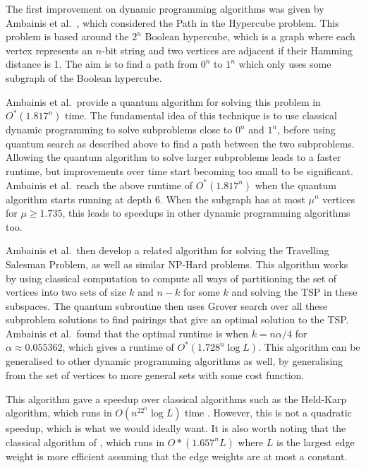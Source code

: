 The first improvement on dynamic programming algorithms was given by Ambainis et al.\ \cite{ambainis2018}, which considered the Path in the Hypercube problem. This problem is based around the $2^n$ Boolean hypercube, which is a graph where each vertex represents an $n$-bit string and two vertices are adjacent if their Hamming distance is 1. The aim is to find a path from $0^n$ to $1^n$ which only uses some subgraph of the Boolean hypercube.

Ambainis et al.\ provide a quantum algorithm for solving this problem in $O^*(1.817^n)$ time. The fundamental idea of this technique is to use classical dynamic programming to solve subproblems close to $0^n$ and $1^n$, before using quantum search as described above to find a path between the two subproblems. Allowing the quantum algorithm to solve larger subproblems leads to a faster runtime, but improvements over time start becoming too small to be significant. Ambainis et al.\ reach the above runtime of $O^*(1.817^n)$ when the quantum algorithm starts running at depth $6$. When the subgraph has at most $\mu^n$ vertices for $\mu \geq 1.735$, this leads to speedups in other dynamic programming algorithms too.

Ambainis et al.\ then develop a related algorithm for solving the Travelling Salesman Problem, as well as similar NP-Hard problems. This algorithm works by using classical computation to compute all ways of partitioning the set of vertices into two sets of size $k$ and $n-k$ for some $k$ and solving the TSP in these subspaces. The quantum subroutine then uses Grover search over all these subproblem solutions to find pairings that give an optimal solution to the TSP. Ambainis et al.\ found that the optimal runtime is when $k=n\alpha/4$ for $\alpha\approx0.055362$, which gives a runtime of $O^*(1.728^n\log L)$. This algorithm can be generalised to other dynamic programming algorithms as well, by generalising from the set of vertices to more general sets with some cost function.

This algorithm gave a speedup over classical algorithms such as the Held-Karp algorithm, which runs in $O(n^22^n\log L)$ time \cite{held1962}. However, this is not a quadratic speedup, which is what we would ideally want. It is also worth noting that the classical algorithm of \cite{bjorklund14}, which runs in $O*(1.657^nL)$ where $L$ is the largest edge weight is more efficient assuming that the edge weights are at most a constant.


